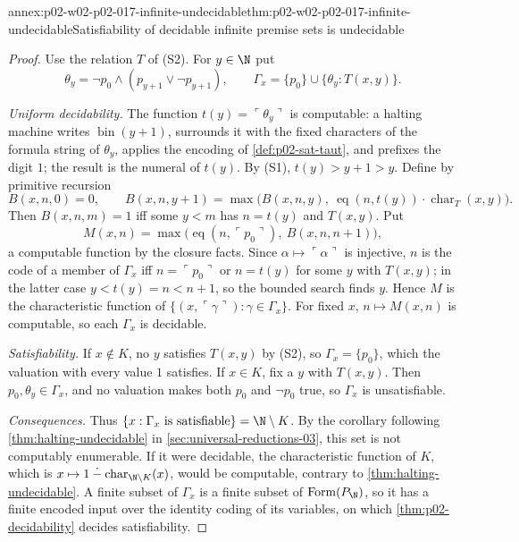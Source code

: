 \begin{annexitem}{annex:p02-w02-p02-017-infinite-undecidable}{thm:p02-w02-p02-017-infinite-undecidable}{Satisfiability of decidable infinite premise sets is undecidable}
\begin{proof}
Use the relation \(T\) of (S2).  For
\(y\in\N\) put
\[
 \theta_y=\neg p_0\land(p_{y+1}\lor\neg p_{y+1}),
 \qquad
 \Gamma_x=\{p_0\}\cup\{\theta_y:T(x,y)\}.
\]

\emph{Uniform decidability.}  The function \(t(y)=\ulcorner\theta_y\urcorner\)
is computable: a halting machine writes \(\operatorname{bin}(y+1)\),
surrounds it with the fixed characters of the formula string of
\(\theta_y\), applies the encoding of \cref{def:p02-sat-taut}, and
prefixes the digit \(1\); the result is the numeral of \(t(y)\).  By
(S1), \(t(y)>y+1>y\).  Define by primitive
recursion
\[
 B(x,n,0)=0,\qquad
 B(x,n,y+1)=\max\bigl(B(x,n,y),\
   \operatorname{eq}(n,t(y))\cdot\operatorname{char}_T(x,y)\bigr).
\]
Then \(B(x,n,m)=1\) iff some \(y<m\) has \(n=t(y)\) and \(T(x,y)\).  Put
\[
 M(x,n)=\max\bigl(\operatorname{eq}(n,\ulcorner p_0\urcorner),\
   B(x,n,n+1)\bigr),
\]
a computable function by the closure facts.  Since
\(\alpha\mapsto\ulcorner\alpha\urcorner\) is injective, \(n\) is the code
of a member of \(\Gamma_x\) iff \(n=\ulcorner p_0\urcorner\) or
\(n=t(y)\) for some \(y\) with \(T(x,y)\); in the latter case
\(y<t(y)=n<n+1\), so the bounded search finds \(y\).  Hence \(M\) is the
characteristic function of
\(\{(x,\ulcorner\gamma\urcorner):\gamma\in\Gamma_x\}\).  For fixed \(x\),
\(n\mapsto M(x,n)\) is computable, so each \(\Gamma_x\) is decidable.

\emph{Satisfiability.}  If \(x\notin K\), no \(y\) satisfies \(T(x,y)\)
by (S2), so \(\Gamma_x=\{p_0\}\), which
the valuation with every value \(1\) satisfies.  If \(x\in K\), fix a
\(y\) with \(T(x,y)\).  Then \(p_0,\theta_y\in\Gamma_x\), and no valuation
makes both \(p_0\) and \(\neg p_0\) true, so \(\Gamma_x\) is
unsatisfiable.

\emph{Consequences.}  Thus \(\{x:\Gamma_x\text{ is satisfiable}\}=
\N\setminus K\).  By the corollary following
\cref{thm:halting-undecidable} in \cref{sec:universal-reductions-03}, this
set is not computably enumerable.  If it were decidable, the characteristic function
of \(K\), which is \(x\mapsto1\mathbin{\dot{-}}\operatorname{char}_{\N\setminus
K}(x)\), would be computable, contrary to
\cref{thm:halting-undecidable}.  A finite subset of \(\Gamma_x\) is a
finite subset of \(\operatorname{Form}(P_{\N})\), so it has a finite encoded input over the
identity coding of its variables, on which \cref{thm:p02-decidability}
decides satisfiability.
\end{proof}
\end{annexitem}

